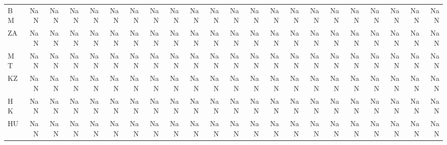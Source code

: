 \begin{table}
\begin{tabular}{lrrrrrrrrrrrrrrrrrrrrr}
BM & NaN & NaN & NaN & NaN & NaN & NaN & NaN & NaN & NaN & NaN & NaN & NaN & NaN & NaN & NaN & NaN & NaN & NaN & NaN & NaN & NaN \\
ZA & NaN & NaN & NaN & NaN & NaN & NaN & NaN & NaN & NaN & NaN & NaN & NaN & NaN & NaN & NaN & NaN & NaN & NaN & NaN & NaN & NaN \\
MT & NaN & NaN & NaN & NaN & NaN & NaN & NaN & NaN & NaN & NaN & NaN & NaN & NaN & NaN & NaN & NaN & NaN & NaN & NaN & NaN & NaN \\
KZ & NaN & NaN & NaN & NaN & NaN & NaN & NaN & NaN & NaN & NaN & NaN & NaN & NaN & NaN & NaN & NaN & NaN & NaN & NaN & NaN & NaN \\
HK & NaN & NaN & NaN & NaN & NaN & NaN & NaN & NaN & NaN & NaN & NaN & NaN & NaN & NaN & NaN & NaN & NaN & NaN & NaN & NaN & NaN \\
HU & NaN & NaN & NaN & NaN & NaN & NaN & NaN & NaN & NaN & NaN & NaN & NaN & NaN & NaN & NaN & NaN & NaN & NaN & NaN & NaN & NaN \\
\bottomrule
\end{tabular}
\end{table}
